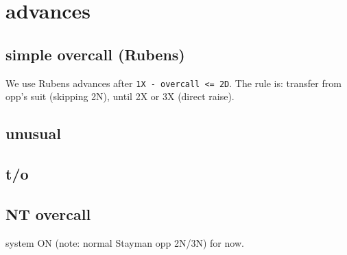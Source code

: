 \section{advances}

\subsection{simple overcall (Rubens)}

We use Rubens advances after \texttt{1X - overcall <= 2D}. 
The rule is: transfer from opp's suit (skipping 2N), until 2X or 3X (direct raise).


\subsection{unusual}


\subsection{t/o}


\subsection{NT overcall}

system ON (note: normal Stayman opp 2N/3N) for now.
